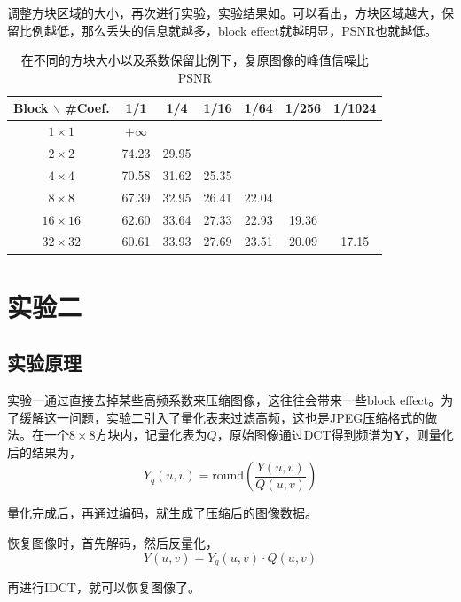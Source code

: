\documentclass[12pt,a4paper]{article}
\begin{document}
调整方块区域的大小，再次进行实验，实验结果如。可以看出，方块区域越大，保留比例越低，那么丢失的信息就越多，block effect就越明显，PSNR也就越低。

\begin{table}[H]
    \centering
    \caption{在不同的方块大小以及系数保留比例下，复原图像的峰值信噪比PSNR}
    \label{tab:block_psnr}
    \begin{tabular}{c|cccccc}
        \toprule
        Block $\backslash$ \#Coef. & 1/1 & 1/4 & 1/16 & 1/64 & 1/256 & 1/1024\tabularnewline
        \midrule
        \(1\times 1\) & $+\infty$ & & & & &\tabularnewline
        \(2\times 2\) & 74.23 & 29.95 & & & &\tabularnewline
        \(4\times 4\) & 70.58 & 31.62 & 25.35 & & &\tabularnewline
        \(8\times 8\) & 67.39 & 32.95 & 26.41 & 22.04 & &\tabularnewline
        \(16\times 16\) & 62.60 & 33.64 & 27.33 & 22.93 & 19.36 &\tabularnewline
        \(32\times 32\) & 60.61 & 33.93 & 27.69 & 23.51 & 20.09 &
        17.15\tabularnewline
        \bottomrule
    \end{tabular}
\end{table}

\section{实验二}

\subsection{实验原理}

实验一通过直接去掉某些高频系数来压缩图像，这往往会带来一些block effect。为了缓解这一问题，实验二引入了量化表来过滤高频，这也是JPEG压缩格式的做法。在一个$8\times 8$方块内，记量化表为$Q$，原始图像通过DCT得到频谱为$\mathbf{Y}$，则量化后的结果为，
\begin{equation}
    Y_q(u,v) = \text{round}\left(\frac{Y(u,v)}{Q(u,v)}\right)
\end{equation}

量化完成后，再通过编码，就生成了压缩后的图像数据。

恢复图像时，首先解码，然后反量化，
\begin{equation}
    Y(u,v) = Y_q(u,v) \cdot Q(u,v)
\end{equation}

再进行IDCT，就可以恢复图像了。
\end{document}
